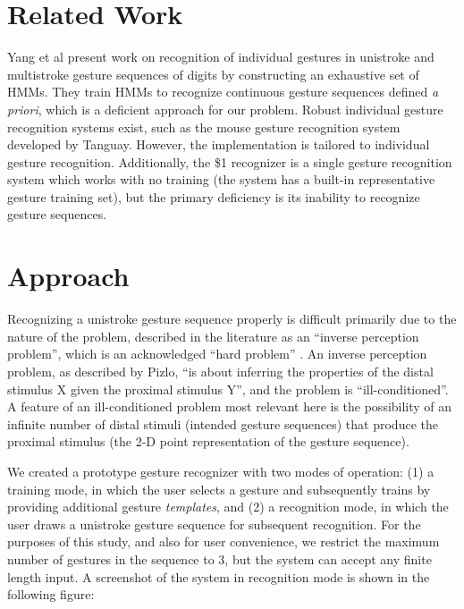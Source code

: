 \documentclass[twoside]{article}
\begin{document}
\begin{multicols}{2}
\section{Related Work}
Yang et al \cite{yang_gesture_1994} present work on recognition of individual
gestures in unistroke and multistroke gesture sequences of digits by
constructing an exhaustive set of HMMs. They train HMMs to recognize continuous
gesture sequences defined \textit{a priori}, which is a deficient approach for
our problem. Robust individual gesture recognition systems exist, such as the
mouse gesture recognition system developed by
Tanguay\cite{tanguay_jr_hidden_1995}. However, the implementation is tailored to
individual gesture recognition. Additionally, the \$1 recognizer
\cite{wobbrock2007gestures} is a single gesture recognition system which works
with no training (the system has a built-in representative gesture training
set), but the primary deficiency is its inability to recognize gesture
sequences.
\section{Approach}
Recognizing a unistroke gesture sequence properly is difficult primarily due to
the nature of the problem, described in the literature as an ``inverse
perception problem'', which is an acknowledged ``hard problem''
\cite{pizlo_perception_2001}. An inverse perception problem, as
described by Pizlo, ``is about inferring the properties of the distal stimulus X
given the proximal stimulus Y'', and the problem is ``ill-conditioned''. A
feature of an ill-conditioned problem most relevant here is the possibility of
an infinite number of distal stimuli (intended gesture sequences) that produce
the proximal stimulus (the 2-D point representation of the gesture sequence).

We created a prototype gesture recognizer with two modes of operation: (1) a
training mode, in which the user selects a gesture and subsequently trains by
providing additional gesture \emph{templates}, and (2) a recognition mode, in
which the user draws a unistroke gesture sequence for subsequent recognition.
For the purposes of this study, and also for user convenience, we restrict the
maximum number of gestures in the sequence to 3, but the system can accept any
finite length input. A screenshot of the system in recognition mode is shown in the following figure:


\end{multicols}
\end{document}
